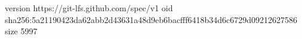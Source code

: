 version https://git-lfs.github.com/spec/v1
oid sha256:5a21190423da62abb2d43631a48d9eb6bacfff6418b34d6c6729d09212627586
size 5997
